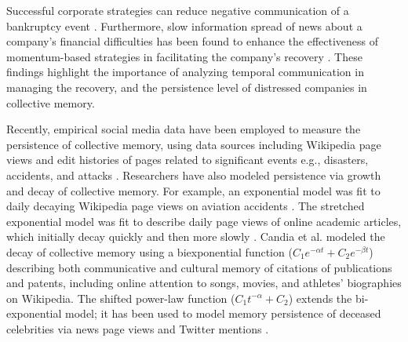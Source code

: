 \documentclass[9pt,twocolumn,twoside,lineno]{pnas-new}
\begin{document}
Successful corporate strategies can reduce negative communication of a bankruptcy event \cite{setiowati2022public}.
Furthermore, slow information spread of news about a company's financial difficulties has been found to enhance the effectiveness of momentum-based strategies in facilitating the company's recovery \cite{hong2000bad, doukas2005european}. 
These findings highlight the importance of analyzing temporal communication in managing the recovery, and the persistence level of distressed companies in collective memory.


Recently, empirical social media data have been employed to measure the persistence of collective memory, using data sources including Wikipedia page views and edit histories of pages related to significant events e.g., disasters, accidents, and attacks \cite{garcia2017memory,mestyan2013early,yasseri2016wikipedia}.
Researchers have also modeled persistence via growth and decay of collective memory.
For example, an exponential model was fit to daily decaying Wikipedia page views on aviation accidents \cite{garcia2016dynamics}.
The stretched exponential model was fit to describe daily page views of online academic articles, which initially decay quickly and then more slowly \cite{kim2021stretched}.
Candia et al. \cite{candia2019universal} modeled the decay of collective memory using a biexponential function ($C_1e^{-\alpha t}+C_2e^{-\beta t}$) describing both communicative and cultural memory of citations of publications and patents, including online attention to songs, movies, and athletes' biographies on Wikipedia.
The shifted power-law function ($C_1t^{-\alpha} + C_2$) extends the bi-exponential model; it has been used to model memory persistence of deceased celebrities via news page views and Twitter mentions \cite{west2021postmortem}.
\end{document}
